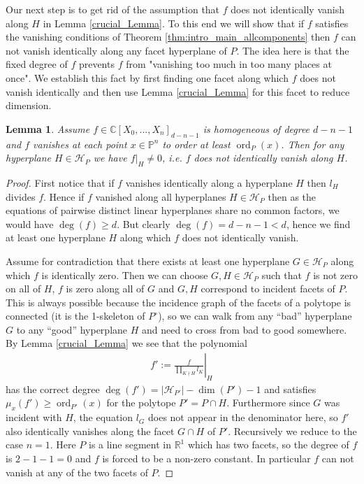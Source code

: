 \documentclass[a4paper,10pt]{amsart}
\theoremstyle{definition}
\theoremstyle{plain}
\newtheorem{lem}[defin]{Lemma}
\newcommand{\ord}{\operatorname{ord}}
\newcommand{\cH}{{\mathcal H}}
\newcommand{\C}{{\mathbb C}}
\newcommand{\R}{{\mathbb R}}
\newcommand{\pp}{\mathbb{P}}
\begin{document}
Our next step is to get rid of the assumption that $f$ does not identically vanish along $H$ in Lemma \ref{crucial_Lemma}. To this end we will show that if $f$ satisfies the vanishing conditions of Theorem \ref{thm:intro_main_allcomponents} then $f$ can not vanish identically along any facet hyperplane of $P$. The idea here is that the fixed degree of $f$ prevents $f$ from "vanishing too much in too many places at once".
We establish this fact by first finding one facet along which $f$ does not vanish identically and then use Lemma \ref{crucial_Lemma} for this facet to reduce dimension.
\begin{lem}
    Assume $f\in \C[X_0,\ldots,X_n]_{d-n-1}$ is homogeneous of degree $d-n-1$ and $f$ vanishes at each point $x\in \pp^n$ to order at least $\ord_P(x)$. Then for any hyperplane $H\in \cH_P$ we have $f|_H\neq 0$, i.e. $f$ does not identically vanish along $H$.
\end{lem}
\begin{proof}
    First notice that if $f$ vanishes identically along a hyperplane $H$ then $l_H$ divides $f$. Hence if $f$ vanished along all hyperplanes $H\in \cH_P$ then as the equations of pairwise distinct linear hyperplanes share no common factors, we would have $\deg(f)\geq d$. But clearly $\deg(f)=d-n-1 < d$, hence we find at least one hyperplane $H$ along which $f$ does not identically vanish. \par
    Assume for contradiction that there exists at least one hyperplane $G\in \cH_P$ along which $f$ is identically zero. Then we can choose $G,H\in \cH_P$ such that $f$ is not zero on all of $H$, $f$ is zero along all of $G$ and $G,H$ correspond to incident facets of $P$. This is always possible because the incidence graph of the facets of a polytope is connected (it is the 1-skeleton of $P^\circ$), so we can walk from any ``bad'' hyperplane $G$ to any ``good'' hyperplane $H$ and need to cross from bad to good somewhere. By Lemma \ref{crucial_Lemma} we see that the polynomial \begin{align*}
        f':=\left.\frac{f}{\prod_{K\nmid H}l_K}\right|_H
    \end{align*} 
    has the correct degree $\deg(f')=|\cH_{P'}|-\dim(P')-1$ and satisfies $\mu_x(f') \geq \ord_{P'}(x)$ for the polytope $P'=P\cap H$. Furthermore since $G$ was incident with $H$, the equation $l_G$ does not appear in the denominator here, so $f'$ also identically vanishes along the facet $G\cap H$ of $P'$. Recursively we reduce to the case $n=1$. Here $P$ is a line segment in $\R^1$ which has two facets, so the degree of $f$ is $2-1-1=0$ and $f$ is forced to be a non-zero constant. In particular $f$ can not vanish at any of the two facets of $P$.
\end{proof}
\end{document}

